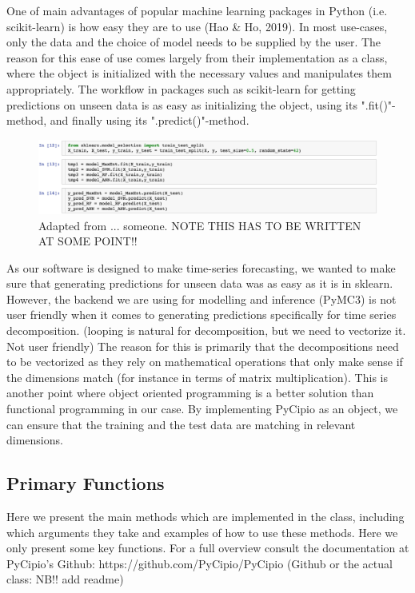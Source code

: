 \documentclass{article}
\begin{document}
One of main advantages of popular machine learning packages in Python (i.e. scikit-learn) is how easy they are to use (Hao \& Ho, 2019). In most use-cases, only the data and the choice of model needs to be supplied by the user. The reason for this ease of use comes largely from their implementation as a class, where the object is initialized with the necessary values and manipulates them appropriately. The workflow in packages such as scikit-learn for getting predictions on unseen data is as easy as initializing the object, using its ".fit()"-method, and finally using its ".predict()"-method. 

\begin{figure}[H]
    \centerline{\includegraphics{images/sklearn.jpeg}}
    \caption{Adapted from ... someone. NOTE THIS HAS TO BE WRITTEN AT SOME POINT!!}
\end{figure}

As our software is designed to make time-series forecasting, we wanted to make sure that generating predictions for unseen data was as easy as it is in sklearn. However, the backend we are using for modelling and inference (PyMC3) is not user friendly when it comes to generating predictions specifically for time series decomposition. (looping is natural for decomposition, but we need to vectorize it. Not user friendly) The reason for this is primarily that the decompositions need to be vectorized as they rely on mathematical operations that only make sense if the dimensions match (for instance in terms of matrix multiplication). This is another point where object oriented programming is a better solution than functional programming in our case. By implementing PyCipio as an object, we can ensure that the training and the test data are matching in relevant dimensions. 

\subsection{Primary Functions}

Here we present the main methods which are implemented in the class, including which arguments they take and examples of how to use these methods. Here we only present some key functions. For a full overview consult the documentation at PyCipio’s Github: https://github.com/PyCipio/PyCipio (Github or the actual class: NB!! add readme)
\end{document}
